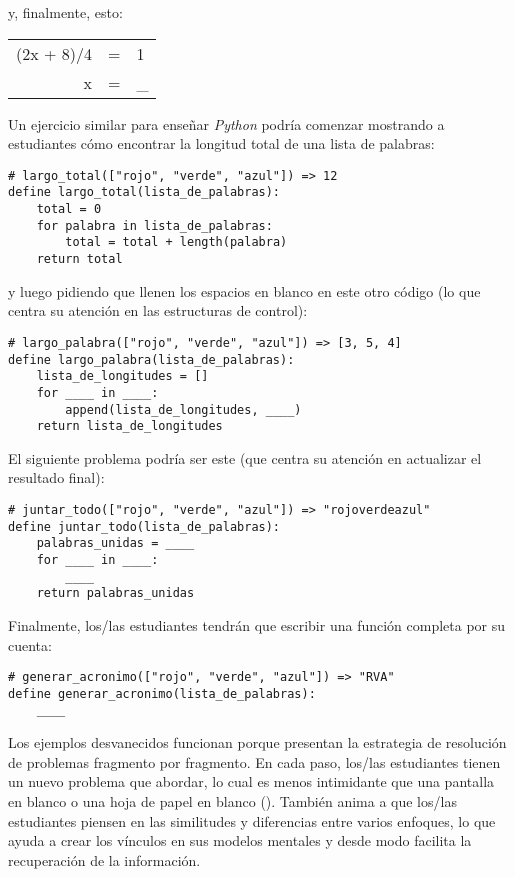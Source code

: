 \noindent
y, finalmente, esto:

\begin{center}
\begin{tabular}{rcl}
  (2x + 8)/4    & = &    1    \\
   x        & = &    \_
\end{tabular}
\end{center}

Un ejercicio similar para enseñar \emph{Python} podría comenzar mostrando a estudiantes
cómo encontrar la longitud total de una lista de palabras:

\begin{verbatim}
# largo_total(["rojo", "verde", "azul"]) => 12
define largo_total(lista_de_palabras):
    total = 0
    for palabra in lista_de_palabras:
        total = total + length(palabra)
    return total
\end{verbatim}

\noindent

y luego pidiendo que llenen los espacios en blanco en este otro código
(lo que centra su atención en las estructuras de control):


\begin{verbatim}
# largo_palabra(["rojo", "verde", "azul"]) => [3, 5, 4]
define largo_palabra(lista_de_palabras):
    lista_de_longitudes = []
    for ____ in ____:
        append(lista_de_longitudes, ____)
    return lista_de_longitudes
\end{verbatim}

El siguiente problema podría ser este
(que centra su atención en actualizar el resultado final):

\begin{verbatim}
# juntar_todo(["rojo", "verde", "azul"]) => "rojoverdeazul"
define juntar_todo(lista_de_palabras):
    palabras_unidas = ____
    for ____ in ____:
        ____
    return palabras_unidas
\end{verbatim}

Finalmente, los/las estudiantes tendrán que escribir una función completa por su cuenta:

\begin{verbatim}
# generar_acronimo(["rojo", "verde", "azul"]) => "RVA"
define generar_acronimo(lista_de_palabras):
    ____
\end{verbatim}

Los ejemplos desvanecidos funcionan porque
presentan la estrategia de resolución de problemas fragmento por fragmento.
En cada paso,
los/las estudiantes tienen un nuevo problema que abordar,
lo cual es menos intimidante que una pantalla en blanco o una hoja de papel en blanco ().
También anima a que los/las estudiantes piensen en las similitudes y diferencias entre varios enfoques,
lo que ayuda a crear los vínculos en sus modelos mentales y desde modo facilita la recuperación de la información.

